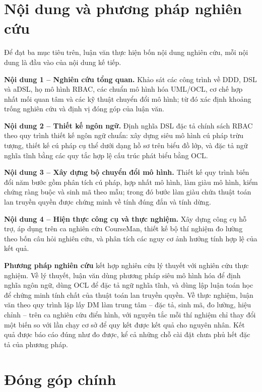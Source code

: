 \section{Nội dung và phương pháp nghiên cứu}
\label{sec:phuong-phap-nc}

Để đạt ba mục tiêu trên, luận văn thực hiện bốn nội dung nghiên cứu, mỗi nội dung là đầu vào của nội dung kế tiếp.

\textbf{Nội dung 1 -- Nghiên cứu tổng quan.} Khảo sát các công trình về DDD, DSL và aDSL, họ mô hình RBAC, các chuẩn mô hình hóa UML/OCL, cơ chế hợp nhất mối quan tâm và các kỹ thuật chuyển đổi mô hình; từ đó xác định khoảng trống nghiên cứu và định vị đóng góp của luận văn.

\textbf{Nội dung 2 -- Thiết kế ngôn ngữ.} Định nghĩa DSL đặc tả chính sách RBAC theo quy trình thiết kế ngôn ngữ chuẩn: xây dựng siêu mô hình cú pháp trừu tượng, thiết kế cú pháp cụ thể dưới dạng hồ sơ trên biểu đồ lớp, và đặc tả ngữ nghĩa tĩnh bằng các quy tắc hợp lệ cấu trúc phát biểu bằng OCL.

\textbf{Nội dung 3 -- Xây dựng bộ chuyển đổi mô hình.} Thiết kế quy trình biến đổi năm bước gồm phân tích cú pháp, hợp nhất mô hình, làm giàu mô hình, kiểm chứng ràng buộc và sinh mã theo mẫu; trong đó bước làm giàu chứa thuật toán lan truyền quyền được chứng minh về tính đúng đắn và tính dừng.

\textbf{Nội dung 4 -- Hiện thực công cụ và thực nghiệm.} Xây dựng công cụ hỗ trợ, áp dụng trên ca nghiên cứu CourseMan, thiết kế bộ thí nghiệm đo lường theo bốn câu hỏi nghiên cứu, và phân tích các nguy cơ ảnh hưởng tính hợp lệ của kết quả.

\textbf{Phương pháp nghiên cứu} kết hợp nghiên cứu lý thuyết với nghiên cứu thực nghiệm. Về lý thuyết, luận văn dùng phương pháp siêu mô hình hóa để định nghĩa ngôn ngữ, dùng OCL để đặc tả ngữ nghĩa tĩnh, và dùng lập luận toán học để chứng minh tính chất của thuật toán lan truyền quyền. Về thực nghiệm, luận văn theo quy trình lặp lấy DM làm trung tâm -- đặc tả, sinh mã, đo lường, hiệu chỉnh -- trên ca nghiên cứu điển hình, với nguyên tắc mỗi thí nghiệm chỉ thay đổi một biến so với lần chạy cơ sở để quy kết được kết quả cho nguyên nhân. Kết quả được báo cáo đúng như đo được, kể cả những chỗ cài đặt chưa phủ hết đặc tả của phương pháp.

\section{Đóng góp chính}
\label{sec:dong-gop}

